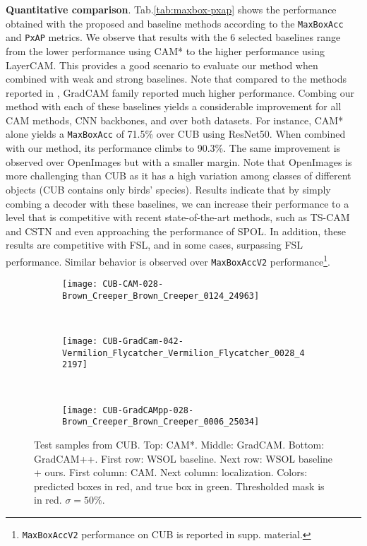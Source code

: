 \documentclass[twocolumn]{article}
\newcommand\maxboxacc{\texttt{MaxBoxAcc}\xspace}
\newcommand\newmaxboxacc{\texttt{MaxBoxAccV2}\xspace}
\newcommand\pxap{\texttt{PxAP}\xspace}
\theoremstyle{definition}
\begin{document}
\noindent \textbf{Quantitative comparison}. Tab.\ref{tab:maxbox-pxap} shows the performance obtained with the proposed and baseline methods according to the \maxboxacc and \pxap metrics. We observe that results with the 6 selected baselines range from the lower performance using CAM* to the higher performance using LayerCAM. This provides a good scenario to evaluate our method when combined with weak and strong baselines. Note that compared to the methods reported in \cite{choe2020evaluating}, GradCAM family reported much higher performance. Combing our method with each of these baselines yields a considerable improvement for all CAM methods, CNN backbones, and over both datasets. For instance, CAM* alone yields a \maxboxacc of 71.5\% over CUB using ResNet50. When combined with our method, its performance climbs to 90.3\%. The same improvement is observed over OpenImages but with a smaller margin. Note that OpenImages is more challenging than CUB as it has a high variation among classes of different objects (CUB contains only birds' species). Results indicate that by simply combing a decoder with these baselines, we can increase their performance to a level that is competitive with recent state-of-the-art methods, such as TS-CAM and CSTN and even approaching the performance of SPOL.  In addition, these results are competitive with FSL, and in some cases, surpassing FSL performance. Similar behavior is observed over \newmaxboxacc performance\footnote{\newmaxboxacc performance on CUB is reported in supp. material.}.

\begin{figure}
     \centering
     \begin{subfigure}[b]{0.45\textwidth}
         \centering
         \texttt{[image: CUB-CAM-028-Brown\_Creeper\_Brown\_Creeper\_0124\_24963]}
     \end{subfigure}
     \\
     \vspace{.2cm}
     \begin{subfigure}[b]{0.45\textwidth}
         \centering
         \texttt{[image: CUB-GradCam-042-Vermilion\_Flycatcher\_Vermilion\_Flycatcher\_0028\_42197]}
     \end{subfigure}
     \\
     \vspace{.2cm}
     \begin{subfigure}[b]{0.45\textwidth}
         \centering
         \texttt{[image: CUB-GradCAMpp-028-Brown\_Creeper\_Brown\_Creeper\_0006\_25034]}
     \end{subfigure}
        \caption{Test samples from CUB. Top: CAM*. Middle: GradCAM. Bottom: GradCAM++. First row: WSOL baseline. Next row: WSOL baseline + ours. First column: CAM. Next column: localization.
        Colors: predicted boxes in red, and true box in green. Thresholded mask is in red. ${\sigma= 50\%}$.}
        \label{fig:mainvisucub}
\end{figure}
\end{document}
